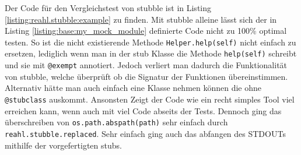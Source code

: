 Der Code für den Vergleichstest von stubble ist in Listing \ref{listing:reahl.stubble:example} zu finden.
Mit stubble alleine lässt sich der in Listing \ref{listing:base:my_mock_module} definierte Code nicht
zu 100\% optimal testen. So ist die nicht existierende Methode \lstinline{Helper.help(self)} nicht einfach
zu ersetzen, lediglich wenn man in der \Gls{stub} Klasse die Methode \lstinline{help(self)} schreibt und
sie mit \lstinline{@exempt} annotiert. Jedoch verliert man dadurch die Funktionalität von stubble, welche
überprüft ob die Signatur der Funktionen übereinstimmen. Alternativ hätte man auch einfach eine Klasse
nehmen können die ohne \lstinline{@stubclass} auskommt. Ansonsten Zeigt der Code wie ein recht simples
Tool viel erreichen kann, wenn auch mit viel Code abseits der Tests. Dennoch ging das überschreiben von
\lstinline{os.path.abspath(path)} sehr einfach durch \lstinline{reahl.stubble.replaced}. Sehr einfach
ging auch das abfangen des STDOUTs mithilfe der vorgefertigten \Glspl{stub}.
